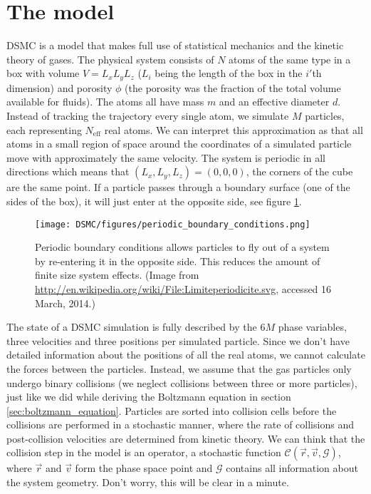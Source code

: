 \section{The model}
\label{sec:dsmc_model}
DSMC is a model that makes full use of statistical mechanics and the kinetic theory of gases. The physical system consists of $N$ atoms of the same type in a box with volume $V = L_xL_yL_z$ ($L_i$ being the length of the box in the $i'$th dimension) and porosity $\phi$ (the porosity was the fraction of the total volume available for fluids). The atoms all have mass $m$ and an effective diameter $d$. Instead of tracking the trajectory every single atom, we simulate $M$ particles, each representing $N_\text{eff}$ real atoms. We can interpret this approximation as that all atoms in a small region of space around the coordinates of a simulated particle move with approximately the same velocity. The system is periodic in all directions which means that $(L_x, L_y, L_z) = (0,0,0)$, the corners of the cube are the same point. If a particle passes through a boundary surface (one of the sides of the box), it will just enter at the opposite side, see figure \ref{fig:dsmc_periodic_boundary_conditions}.
\begin{figure}[ht]
\begin{center}
\texttt{[image: DSMC/figures/periodic\_boundary\_conditions.png]}
\end{center}
\caption{Periodic boundary conditions allows particles to fly out of a system by re-entering it in the opposite side. This reduces the amount of finite size system effects. (Image from \url{http://en.wikipedia.org/wiki/File:Limiteperiodicite.svg}, accessed 16 March, 2014.)}
\label{fig:dsmc_periodic_boundary_conditions}
\end{figure}
The state of a DSMC simulation is fully described by the $6M$ phase variables, three velocities and three positions per simulated particle. Since we don't have detailed information about the positions of all the real atoms, we cannot calculate the forces between the particles. Instead, we assume that the gas particles only undergo binary collisions (we neglect collisions between three or more particles), just like we did while deriving the Boltzmann equation in section \ref{sec:boltzmann_equation}. Particles are sorted into collision cells before the collisions are performed in a stochastic manner, where the rate of collisions and post-collision velocities are determined from kinetic theory. We can think that the collision step in the model is an operator, a stochastic function $\mathcal{C}(\vec r, \vec v, \mathcal{G})$, where $\vec r$ and $\vec v$ form the phase space point and $\mathcal G$ contains all information about the system geometry. Don't worry, this will be clear in a minute.\\
